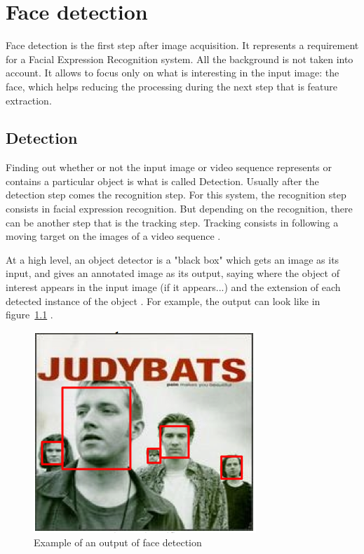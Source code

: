 \chapter{Face detection}

\noindent Face detection is the first step after image acquisition. It represents a requirement for a Facial Expression Recognition system. All the background is not taken into account. It allows to focus only on what is interesting in the input image: the face, which helps reducing the processing during the next step that is feature extraction.
\newline

\section{Detection}

\vspace{\baselineskip}
\noindent Finding out whether or not the input image or video sequence represents or contains a particular object is what is called Detection. Usually after the detection step comes the recognition step. For this system, the recognition step consists in facial expression recognition. But depending on the recognition, there can be another step that is the tracking step. Tracking consists in following a moving target on the images of a video sequence \cite{DIN08}.
\newline

\noindent At a high level, an object detector is a "black box" which gets an image as its input, and gives an annotated image as its output, saying where the object of interest appears in the input image (if it appears...) and the extension of each detected instance of the object \cite{DIN08}. For example, the output can look like in figure~\ref{output_example_face_detection} \cite{DIN08}.
\newline

\begin{figure}[!h]
\begin{center}
\noindent \includegraphics[scale=0.7]{figures/output_example_face_detection} 
\newline
\caption{Example of an output of face detection}
\label{output_example_face_detection}
\end{center} 
\end{figure}

